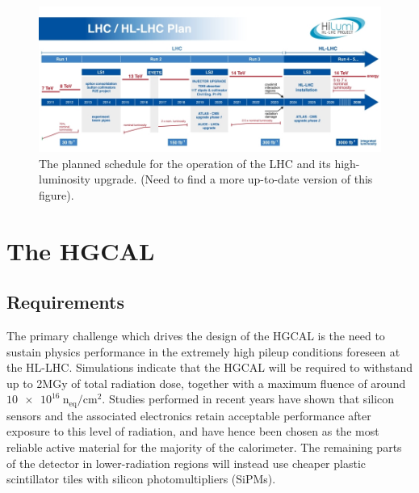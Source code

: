 \begin{figure}[h!]
  \centering
  \includegraphics[width=\textwidth]{Figures/HGCAL/LHCschedule.jpg}
  \caption[Planned LHC and HL-LHC schedule]
  {The planned schedule for the operation of the LHC and its high-luminosity upgrade.
  (Need to find a more up-to-date version of this figure).}
  \label{fig:hgcal_LHCschedule}
\end{figure}


\section{The HGCAL}

\subsection{Requirements}

The primary challenge which drives the design of the HGCAL is the need to sustain physics performance in the extremely high pileup conditions foreseen at the HL-LHC.
Simulations indicate that the HGCAL will be required to withstand up to 2MGy of total radiation dose, together with a maximum fluence of around $\SI{10e16}{\textrm{n}_{\textrm{eq}}/\textrm{cm}^2}.$
Studies performed in recent years have shown that silicon sensors and the associated electronics retain acceptable performance after exposure to this level of radiation, 
and have hence been chosen as the most reliable active material for the majority of the calorimeter. 
The remaining parts of the detector in lower-radiation regions will instead use cheaper plastic scintillator tiles with silicon photomultipliers (SiPMs). 

